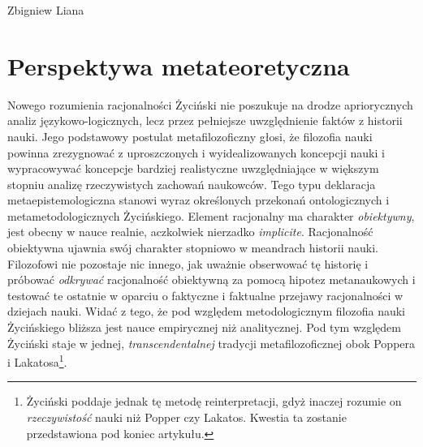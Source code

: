 \begin{artplenv}{Zbigniew Liana}
\section{Perspektywa metateoretyczna}

Nowego rozumienia racjonalności Życiński nie poszukuje na drodze apriorycznych analiz językowo-logicznych, lecz przez
pełniejsze uwzględnienie faktów z historii nauki. Jego podstawowy postulat metafilozoficzny głosi, że filozofia nauki
powinna zrezygnować z uproszczonych i wyidealizowanych koncepcji nauki i wypracowywać koncepcje bardziej realistyczne
uwzględniające w większym stopniu analizę rzeczywistych zachowań naukowców. Tego typu deklaracja metaepistemologiczna
stanowi wyraz określonych przekonań ontologicznych i metametodologicznych Życińskiego. Element racjonalny ma charakter
\textit{obiektywny}, jest obecny w nauce realnie, aczkolwiek nierzadko \textit{implicite}. Racjonalność obiektywna ujawnia
swój charakter stopniowo w meandrach historii nauki. Filozofowi nie pozostaje nic innego, jak uważnie obserwować tę
historię i próbować \textit{odkrywać }racjonalność obiektywną za pomocą hipotez metanaukowych i testować te
ostatnie w oparciu o faktyczne i faktualne przejawy racjonalności w dziejach nauki. Widać z tego, że pod względem metodologicznym
filozofia nauki Życińskiego bliższa jest nauce empirycznej niż analitycznej. Pod tym względem Życiński staje w jednej,
\textit{transcendentalnej} tradycji metafilozoficznej obok Poppera i Lakatosa\footnote{Życiński poddaje jednak tę metodę
reinterpretacji, gdyż inaczej rozumie on \textit{rzeczywistość} nauki niż Popper czy Lakatos. Kwestia ta zostanie
przedstawiona pod koniec artykułu.}.


\end{artplenv}
